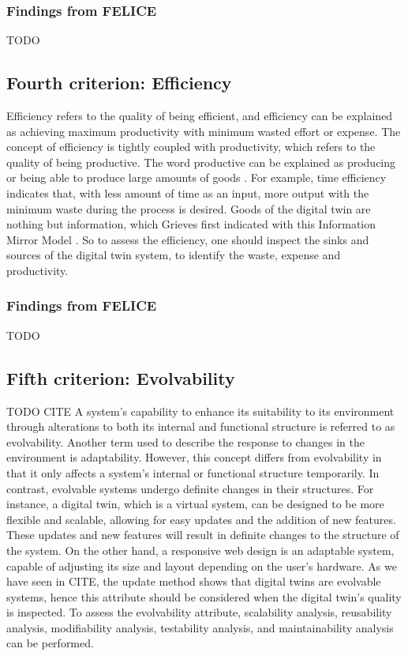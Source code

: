 \documentclass[9pt,conference]{IEEEtran}
\begin{document}
    \subsubsection{Findings from FELICE}
    TODO

    \subsection{Fourth criterion: Efficiency}
    Efficiency refers to the quality of being efficient, and efficiency can be explained as achieving maximum productivity with minimum wasted effort or expense. 
    The concept of efficiency is tightly coupled with productivity, which refers to the quality of being productive. The word productive can be explained as producing or being able to produce large amounts of goods \cite{OxfordDictionary}.
    For example, time efficiency indicates that,  with less amount of time as an input, more output with the minimum waste during the process is desired. Goods of the digital twin are nothing but information, 
    which Grieves first indicated with this Information Mirror Model \cite{GrievesPLMBook}. So to assess the efficiency, one should inspect the sinks and sources of the digital twin system, to identify the waste, expense and productivity. 

    \subsubsection{Findings from FELICE}
    TODO

    \subsection{Fifth criterion: Evolvability}
    TODO CITE
    A system's capability to enhance its suitability to its environment through alterations to both its internal and functional structure is referred to as evolvability. Another term used to describe the response to changes in the environment is adaptability. 
    However, this concept differs from evolvability in that it only affects a system's internal or functional structure temporarily. In contrast, evolvable systems undergo definite changes in their structures.  
    For instance, a digital twin, which is a virtual system, can be designed to be more flexible and scalable, allowing for easy updates and the addition of new features. 
    These updates and new features will result in definite changes to the structure of the system. On the other hand, a responsive web design is an adaptable system, capable of adjusting its size and layout depending on the user's hardware. 
    As we have seen in CITE, the update method shows that digital twins are evolvable systems,
    hence this attribute should be considered when the digital twin's quality is inspected. To assess the evolvability attribute, scalability analysis, reusability analysis, modifiability analysis, testability analysis, and maintainability analysis can be performed. 
\end{document}
